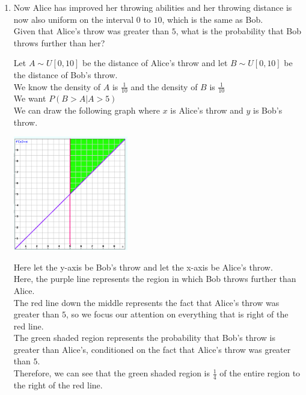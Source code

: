 \begin{enumerate}[label=(\alph*)]
\item Now Alice has improved her throwing abilities and her throwing distance is now also uniform on the interval $0$ to $10$, which is the same as Bob. \\
Given that Alice's throw was greater than $5$, what is the probability that Bob throws further than her? 
\begin{solution} [1cm]
	Let $A \mathtt{\sim} U[0, 10]$ be the distance of Alice's throw and let $B \mathtt{\sim} U[0, 10]$ be the distance of Bob's throw.  \\
	We know the density of $A$ is $\frac{1}{10}$ and the density of $B$ is $\frac{1}{10}$ \\
	We want $P(B > A | A > 5)$ \\
	We can draw the following graph where $x$ is Alice's throw and $y$ is Bob's throw. \\
	\begin{center}
		\includegraphics[width=5cm]{joint_uniform2.png}
	\end{center}
	Here let the y-axis be Bob's throw and let the x-axis be Alice's throw. \\
	Here, the purple line represents the region in which Bob throws further than Alice. \\
	The red line down the middle represents the fact that Alice's throw was greater than $5$, so we focus our attention on everything that is right of the red line. \\
	The green shaded region represents the probability that Bob's throw is greater than Alice's, conditioned on the fact that Alice's throw was greater than $5$. \\
	Therefore, we can see that the green shaded region is $\frac{1}{4}$ of the entire region to the right of the red line. \\
	

\end{solution}
\end{enumerate}
